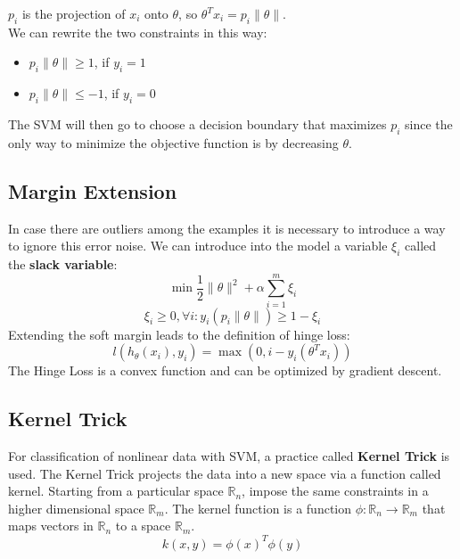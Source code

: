 $p_i$ is the projection of $x_i$ onto $\theta$, so $\theta^Tx_i = p_i\|\theta\|$. \\
We can rewrite the two constraints in this way:
\begin{itemize}
    \item $p_i\|\theta\| \geq 1$, if $y_i = 1$
    \item $p_i\|\theta\| \leq -1$, if $y_i = 0$
\end{itemize}
The SVM will then go to choose a decision boundary that maximizes $p_i$ since the only way to minimize the objective function is by decreasing $\theta$.

\newpage
\subsection{Margin Extension}
In case there are outliers among the examples it is necessary to introduce a way to ignore this error noise.  We can introduce into the model a variable $\xi_i$ called the \textbf{slack variable}:
\begin{equation} \tag*{}
    \min \frac{1}{2} \|\theta\|^2 + \alpha \sum^m_{i=1} \xi_i
\end{equation}
\begin{equation} \tag*{}
    \xi_i \geq 0, \forall i:y_i(p_i\|\theta\|) \geq 1 - \xi_i
\end{equation}
Extending the soft margin leads to the definition of hinge loss:
\begin{equation} \tag*{}
    l(h_\theta(x_i),y_i) = \max (0,i - y_i(\theta^Tx_i))
\end{equation}
The Hinge Loss is a convex function and can be optimized by gradient descent.

\subsection{Kernel Trick}
For classification of nonlinear data with SVM, a practice called \textbf{Kernel Trick} is used. The Kernel Trick projects the data into a new space via a function called kernel. Starting from a particular space $\mathbb{R}_n$, impose the same constraints in a higher dimensional space $\mathbb{R}_m$. The kernel function is a function $\phi:\mathbb{R}_n \rightarrow \mathbb{R}_m$ that maps vectors in $\mathbb{R}_n$ to a space $\mathbb{R}_m$.
\begin{equation}
    k(x,y) = \phi(x)^T \phi(y)
\end{equation}

\newpage